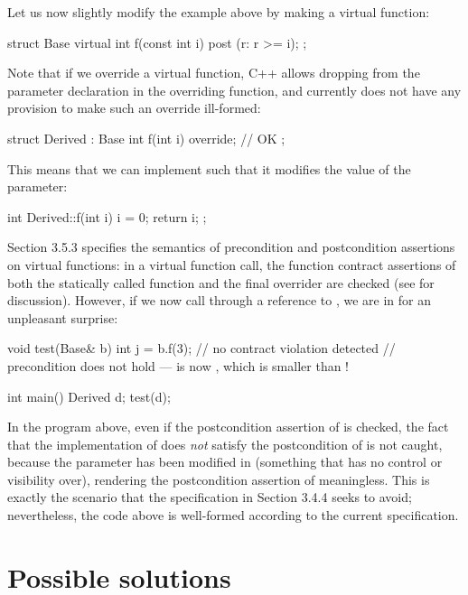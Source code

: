 Let us now slightly modify the example above by making  a virtual function:
\begin{codeblock}
struct Base {
  virtual int f(const int i) post (r: r >= i);
};
\end{codeblock}
Note that if we override a virtual function, C++ allows dropping  from the parameter declaration in the overriding function, and \cite{P2900R10} currently does not have any provision to make such an override ill-formed:
\begin{codeblock}
struct Derived : Base {
  int f(int i) override; // OK
};
\end{codeblock}
This means that we can implement  such that it modifies the value of the parameter:
\begin{codeblock}
int Derived::f(int i) {
  i = 0;
  return i;
};
\end{codeblock}
\cite{P2900R10} Section 3.5.3 specifies the semantics of precondition and postcondition assertions on virtual functions: in a virtual function call, the function contract assertions of both the statically called function  and the final overrider  are checked (see \cite{P3097R0} for discussion). However, if we now call  through a reference to , we are in for an unpleasant surprise:
\begin{codeblock}
void test(Base& b) {
  int j = b.f(3);  // no contract violation detected
  // precondition does not hold ---  is now , which is smaller than !
}

int main() {
  Derived d;
  test(d);
}
\end{codeblock}

In the program above, even if the postcondition assertion of  is checked, the fact that the implementation of  does \emph{not} satisfy the postcondition of  is not caught, because the parameter  has been modified in  (something that  has no control or visibility over), rendering the postcondition assertion of  meaningless. This is exactly the scenario that the specification in \cite{P2900R10} Section 3.4.4 seeks to avoid; nevertheless, the code above is well-formed according to the current specification.

\section{Possible solutions}

